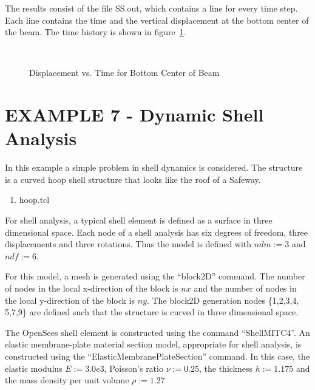 \documentclass[12pt]{article}
\begin{document}
\vspace{0.2in} 

The results consist of the file SS.out, which contains a line for
every time step. 
Each line contains the time and the vertical
displacement 
at the bottom center of the beam.
The time history is shown in
figure~\ref{beamdisp}. 
\begin{figure}[h]
\begin{center}
\leavevmode
\hbox{%
\epsfxsize=4.0in
\epsfysize=2.8in
}
\end{center}
\caption{Displacement vs. Time for Bottom Center of Beam}
\label{beamdisp}
\end{figure}





\clearpage
\section {EXAMPLE 7 - Dynamic Shell Analysis}

In this example a simple problem in shell dynamics is considered.
The structure is a curved hoop shell structure that looks like the 
roof of a Safeway.

\vspace{0.2in}  
\begin{enumerate} 
\item hoop.tcl
\end{enumerate}

\vspace{0.2in} 

For shell analysis, a typical shell element is defined as a surface in
three dimensional space.  Each node of a shell analysis has six degrees of freedom, 
three displacements and three rotations.  Thus the model is defined with 
$ndm := 3$ and $ndf := 6$.

For this model, a mesh is generated using the ``block2D'' command.  The number of 
nodes in the local x-direction of the block is $nx$ and
the number of 
nodes in the local y-direction of the block is $ny$.
The block2D generation nodes \{1,2,3,4, 5,7,9\}
 are defined such that the structure is curved
in three dimensional space.

The OpenSees shell element is constructed using the command ``ShellMITC4''.
An elastic membrane-plate material section model, appropriate for shell analysis, is 
constructed using the ``ElasticMembranePlateSection'' command.
In this case, the elastic modulus $E := 3.0e3$, Poisson's ratio
$\nu :=  0.25$, 
the thickness $h := 1.175$ and
the mass density per unit volume $\rho := 1.27$
\end{document}
